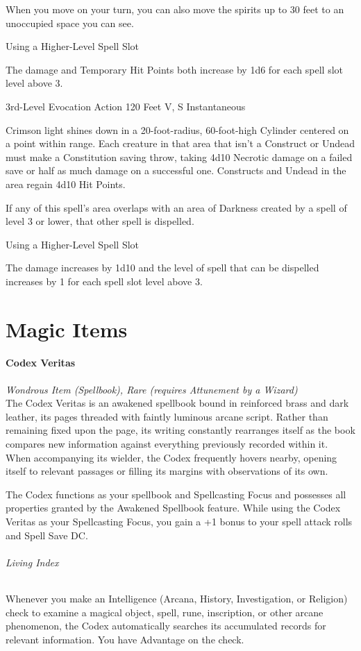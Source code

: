 \documentclass[letterpaper,openany,oneside,twocolumn]{book}
\begin{document}
When you move on your turn, you can also move the spirits up to 30 feet to an unoccupied space you can see.

\subparagraph*{Using a Higher-Level Spell Slot} The damage and Temporary Hit Points both increase by 1d6 for each spell slot level above 3.

	{3rd-Level Evocation}
	{Action}
	{120 Feet}
	{V, S}
	{Instantaneous}

Crimson light shines down in a 20-foot-radius, 60-foot-high Cylinder centered on a point within range. Each creature in that area that isn't a Construct or Undead must make a Constitution saving throw, taking 4d10 Necrotic damage on a failed save or half as much damage on a successful one. Constructs and Undead in the area regain 4d10 Hit Points.

If any of this spell's area overlaps with an area of Darkness created by a spell of level 3 or lower, that other spell is dispelled.

\subparagraph*{Using a Higher-Level Spell Slot} The damage increases by 1d10 and the level of spell that can be dispelled increases by 1 for each spell slot level above 3.

\part*{Magic Items}
\subsection*{Codex Veritas}
\textit{Wondrous Item (Spellbook), Rare (requires Attunement by a Wizard)}\\
The Codex Veritas is an awakened spellbook bound in reinforced brass and dark leather, its pages threaded with faintly luminous arcane script. Rather than remaining fixed upon the page, its writing constantly rearranges itself as the book compares new information against everything previously recorded within it. When accompanying its wielder, the Codex frequently hovers nearby, opening itself to relevant passages or filling its margins with observations of its own.

The Codex functions as your spellbook and Spellcasting Focus and possesses all properties granted by the Awakened Spellbook feature. While using the Codex Veritas as your Spellcasting Focus, you gain a +1 bonus to your spell attack rolls and Spell Save DC.\\
\paragraph*{Living Index} Whenever you make an Intelligence (Arcana, History, Investigation, or Religion) check to examine a magical object, spell, rune, inscription, or other arcane phenomenon, the Codex automatically searches its accumulated records for relevant information. You have Advantage on the check.\\
\end{document}
